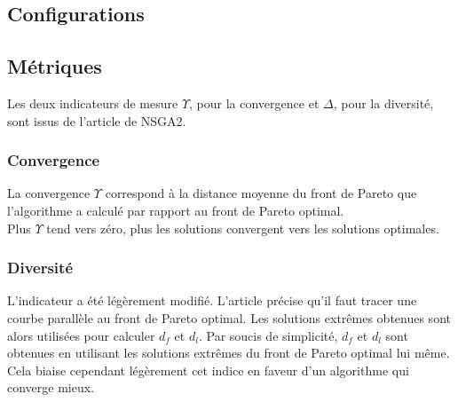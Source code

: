 \documentclass[12pt, letterpaper]{article}
\begin{document}
\subsection{Configurations}



\FloatBarrier

\subsection{Métriques}
Les deux indicateurs de mesure $\Upsilon$, pour la convergence et
$\Delta$, pour la diversité, sont issus de l'article de NSGA2.

\subsubsection{Convergence}
La convergence $\Upsilon$ correspond à la distance moyenne du front
de Pareto que l'algorithme a calculé par rapport au front de Pareto
optimal.\\


Plus $\Upsilon$ tend vers zéro, plus les solutions convergent vers
les solutions optimales.

\subsubsection{Diversité}
L'indicateur a été légèrement modifié. L'article précise qu'il faut
tracer une courbe parallèle au front de Pareto optimal. Les solutions
extrêmes obtenues sont alors utilisées pour calculer $d_f$ et
$d_l$. Par soucis de simplicité, $d_f$ et $d_l$ sont obtenues en
utilisant les solutions extrêmes du front de Pareto optimal lui
même. Cela biaise cependant légèrement cet indice en faveur d'un
algorithme qui converge mieux.\\
\end{document}
